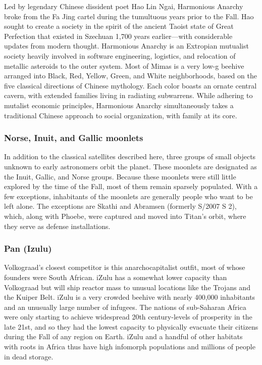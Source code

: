 Led by legendary Chinese dissident poet Hao Lin Ngai, Harmonious Anarchy broke from the Fa Jing cartel during the tumultuous years prior to the Fall. Hao sought to create a society in the spirit of the ancient Taoist state of Great Perfection that existed in Szechuan 1,700 years earlier—with considerable updates from modern thought. Harmonious Anarchy is an Extropian mutualist society heavily involved in software engineering, logistics, and relocation of metallic asteroids to the outer system. Most of Mimas is a very low-g beehive arranged into Black, Red, Yellow, Green, and White neighborhoods, based on the five classical directions of Chinese mythology. Each color boasts an ornate central cavern, with extended families living in radiating subwarrens. While adhering to mutalist economic principles, Harmonious Anarchy simultaneously takes a traditional Chinese approach to social organization, with family at its core. 

\subsubsection{Norse, Inuit, and Gallic moonlets} \label{sec:norse-inuit-gallic} 

In addition to the classical satellites described here, three groups of small objects unknown to early astronomers orbit the planet. These moonlets are designated as the Inuit, Gallic, and Norse groups. Because these moonlets were still little explored by the time of the Fall, most of them remain sparsely populated. With a few exceptions, inhabitants of the moonlets are generally people who want to be left alone. The exceptions are Skathi and Abramsen (formerly S/2007 S 2), which, along with Phoebe, were captured and moved into Titan's orbit, where they serve as defense installations. 

\subsubsection{Pan (Izulu)} \label{sec:pan-izulu} 

Volkograad's closest competitor is this anarchocapitalist outfit, most of whose founders were South African. iZulu has a somewhat lower capacity than Volkograad but will ship reactor mass to unusual locations like the Trojans and the Kuiper Belt. iZulu is a very crowded beehive with nearly 400,000 inhabitants and an unusually large number of infugees. The nations of sub-Saharan Africa were only starting to achieve widespread 20th century-levels of prosperity in the late 21st, and so they had the lowest capacity to physically evacuate their citizens during the Fall of any region on Earth. iZulu and a handful of other habitats with roots in Africa thus have high infomorph populations and millions of people in dead storage. 

